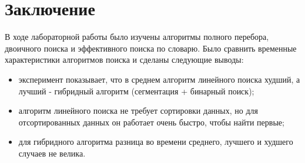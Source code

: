 \chapter*{Заключение}

В ходе лабораторной работы было изучены алгоритмы полного перебора, двоичного поиска и эффективного поиска по словарю.
Было сравнить временные характеристики алгоритмов поиска
и сделаны следующие выводы:

\begin{itemize}
    \item эксперимент показывает, что в среднем алгоритм линейного поиска худший, а лучший - гибридный алгоритм (сегментация + бинарный поиск);
    \item алгоритм линейного поиска не требует сортировки данных, но для отсортированных данных он работает очень быстро, чтобы найти первые;
    \item для гибридного алгоритма разница во времени среднего, лучшего и худшего случаев не велика.
\end{itemize}
